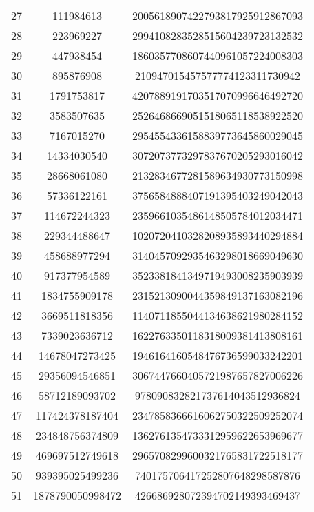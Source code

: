 \documentclass[fleqn]{article}
\begin{document}
\begin{center}
\begin{tabular}{c | c | c}
            27 & 111984613 & 2005618907422793817925912867093 \\
            28 & 223969227 & 2994108283528515604239723132532 \\
            29 & 447938454 & 1860357708607440961057224008303 \\
            30 & 895876908 & 210947015457577774123311730942 \\
            31 & 1791753817 & 4207889191703517070996646492720 \\
            32 & 3583507635 & 2526468669051518065118538922520 \\
            33 & 7167015270 & 2954554336158839773645860029045 \\
            34 & 14334030540 & 3072073773297837670205293016042 \\
            35 & 28668061080 & 2132834677281589634930773150998 \\
            36 & 57336122161 & 3756584888407191395403249042043 \\
            37 & 114672244323 & 2359661035486148505784012034471 \\
            38 & 229344488647 & 1020720410328208935893440294884 \\
            39 & 458688977294 & 3140457092935463298018669049630 \\
            40 & 917377954589 & 3523381841349719493008235903939 \\
            41 & 1834755909178 & 2315213090044359849137163082196 \\
            42 & 3669511818356 & 1140711855044134638621980284152 \\
            43 & 7339023636712 & 1622763350118318009381413808161 \\
            44 & 14678047273425 & 1946164160548476736599033242201 \\
            45 & 29356094546851 & 3067447660405721987657827006226 \\
            46 & 58712189093702 & 978090832821737614043512936824 \\
            47 & 117424378187404 & 2347858366616062750322509252074 \\
            48 & 234848756374809 & 1362761354733312959622653969677 \\
            49 & 469697512749618 & 2965708299600321765831722518177 \\
            50 & 939395025499236 & 740175706417252807648298587876 \\
            51 & 1878790050998472 & 426686928072394702149393469437 \\

\end{tabular}
\end{center}
\end{document}
